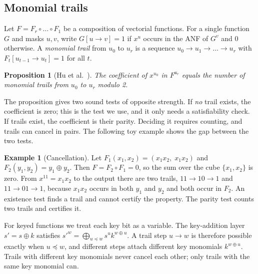 \documentclass[11pt,a4paper]{article}
\newtheorem{proposition}{Proposition}
\theoremstyle{definition}
\newtheorem{example}{Example}
\theoremstyle{remark}
\begin{document}
\subsection{Monomial trails}
Let $F=F_r\circ\dots\circ F_1$ be a composition of vectorial functions. For a single function $G$ and masks $u,v$, write $G[u\to v]=1$ if $x^u$ occurs in the ANF of $G^v$ and $0$ otherwise. A \emph{monomial trail} from $u_0$ to $u_r$ is a sequence $u_0\to u_1\to\dots\to u_r$ with $F_t[u_{t-1}\to u_t]=1$ for all $t$.

\begin{proposition}[Hu et al.~\cite{hu2020mp}]\label{prop:mp}
The coefficient of $x^{u_0}$ in $F^{u_r}$ equals the number of monomial trails from $u_0$ to $u_r$ modulo 2.
\end{proposition}

The proposition gives two sound tests of opposite strength. If \emph{no} trail exists, the coefficient is zero; this is the test we use, and it only needs a satisfiability check. If trails exist, the coefficient is their parity. Deciding it requires counting, and trails can cancel in pairs. The following toy example shows the gap between the two tests.

\begin{example}[Cancellation]\label{ex:cancel}
Let $F_1(x_1,x_2)=(x_1x_2,\;x_1x_2)$ and $F_2(y_1,y_2)=y_1\oplus y_2$. Then $F=F_2\circ F_1=0$, so the sum over the cube $\{x_1,x_2\}$ is zero. From $x^{11}=x_1x_2$ to the output there are two trails, $11\to10\to1$ and $11\to01\to1$, because $x_1x_2$ occurs in both $y_1$ and $y_2$ and both occur in $F_2$. An existence test finds a trail and cannot certify the property. The parity test counts two trails and certifies it.
\end{example}

For keyed functions we treat each key bit as a variable. The key-addition layer $s'=s\oplus k$ satisfies $s'^w=\bigoplus_{u\preceq w}s^uk^{w\oplus u}$. A trail step $u\to w$ is therefore possible exactly when $u\preceq w$, and different steps attach different key monomials $k^{w\oplus u}$. Trails with different key monomials never cancel each other; only trails with the same key monomial can.
\end{document}
